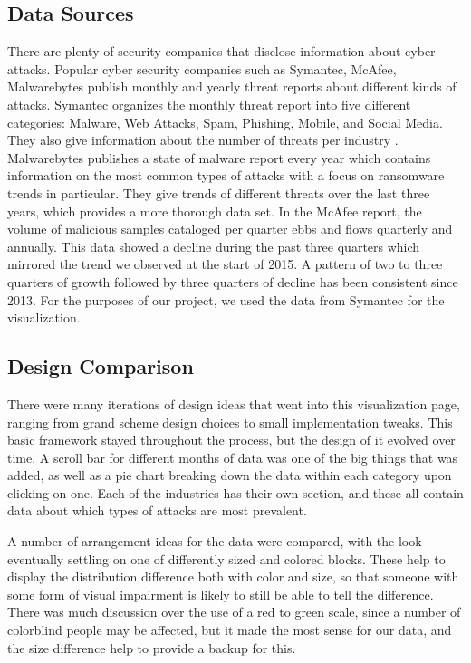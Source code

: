 \documentclass[journal]{vgtc}                %
\begin{document}
\subsection{Data Sources}
There are plenty of security companies that disclose information about cyber attacks. 
Popular cyber security companies such as Symantec, McAfee, Malwarebytes publish monthly and yearly threat reports about different kinds of attacks. 
Symantec organizes the monthly threat report into five different categories: Malware, Web Attacks, Spam, Phishing, Mobile, and Social Media. 
They also give information about the number of threats per industry \cite{SMR}.
Malwarebytes publishes a state of malware report every year which contains information on the most common types of attacks with a focus on ransomware trends in particular. 
They give trends of different threats over the last three years, which provides a more thorough data set. \cite{MWB}
In the McAfee report, the volume of malicious samples cataloged per quarter ebbs and flows quarterly and annually. 
This data showed a decline during the past three quarters which mirrored the trend we observed at the start of 2015. 
A pattern of two to three quarters of growth followed by three quarters of decline has been consistent since 2013. \cite{QT17}
For the purposes of our project, we used the data from Symantec for the visualization.

\subsection{Design Comparison}
There were many iterations of design ideas that went into this visualization page, ranging from grand scheme design choices to small implementation tweaks.
This basic framework stayed throughout the process, but the design of it evolved over time. 
A scroll bar for different months of data was one of the big things that was added, as well as a pie chart breaking down the data within each category upon clicking on one.
Each of the industries has their own section, and these all contain data about which types of attacks are most prevalent.

A number of arrangement ideas for the data were compared, with the look eventually settling on one of differently sized and colored blocks.
These help to display the distribution difference both with color and size, so that someone with some form of visual impairment is likely to still be able to tell the difference.
There was much discussion over the use of a red to green scale, since a number of colorblind people may be affected, but it made the most sense for our data, and the size difference help to provide a backup for this.
\end{document}

